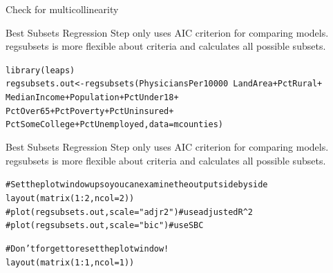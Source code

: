 \documentclass{beamer}\usepackage[]{graphicx}\usepackage[]{color}
\makeatletter
\newcommand{\hlnum}[1]{\textcolor[rgb]{0.824,0.412,0.118}{#1}}%
\newcommand{\hlcom}[1]{\textcolor[rgb]{0.824,0.706,0.549}{#1}}%
\newcommand{\hlopt}[1]{\textcolor[rgb]{1,0.894,0.769}{#1}}%
\newcommand{\hlstd}[1]{\textcolor[rgb]{1,0.894,0.769}{#1}}%
\newcommand{\hlkwb}[1]{\textcolor[rgb]{0.804,0.776,0.451}{#1}}%
\newcommand{\hlkwc}[1]{\textcolor[rgb]{0.78,0.941,0.545}{#1}}%
\newcommand{\hlkwd}[1]{\textcolor[rgb]{1,0.78,0.769}{#1}}%
\newenvironment{kframe}{%
 \def\at@end@of@kframe{}%
 \ifinner\ifhmode%
  \def\at@end@of@kframe{\end{minipage}}%
  \begin{minipage}{\columnwidth}%
 \fi\fi%
 \def\FrameCommand##1{\hskip\@totalleftmargin \hskip-\fboxsep
 \colorbox{shadecolor}{##1}\hskip-\fboxsep
     \hskip-\linewidth \hskip-\@totalleftmargin \hskip\columnwidth}%
 \MakeFramed {\advance\hsize-\width
   \@totalleftmargin\z@ \linewidth\hsize
   \@setminipage}}%
 {\par\unskip\endMakeFramed%
 \at@end@of@kframe}
\newenvironment{knitrout}{}{} %
\makeatother
\begin{document}
\begin{darkframes}
\begin{frame}[fragile]{Check for multicollinearity}
    \end{frame}


    \begin{frame}[fragile]{Best Subsets Regression}
     Step only uses AIC criterion for comparing models. regsubsets is more flexible about criteria and calculates all possible subsets. 

\begin{knitrout}
\begin{kframe}
\begin{alltt}
\hlkwd{library}\hlstd{(leaps)}
\hlstd{regsubsets.out} \hlkwb{<-} \hlkwd{regsubsets}\hlstd{(PhysiciansPer10000} \hlopt{~} \hlstd{LandArea}\hlopt{+}\hlstd{PctRural}\hlopt{+}
            \hlstd{MedianIncome}\hlopt{+}\hlstd{Population}\hlopt{+}\hlstd{PctUnder18}\hlopt{+}
            \hlstd{PctOver65}\hlopt{+}\hlstd{PctPoverty}\hlopt{+}\hlstd{PctUninsured}\hlopt{+}
            \hlstd{PctSomeCollege}\hlopt{+}\hlstd{PctUnemployed,} \hlkwc{data}\hlstd{=mcounties)}
\end{alltt}
\end{kframe}
\end{knitrout}

    \end{frame}


    \begin{frame}[fragile]{Best Subsets Regression}
     Step only uses AIC criterion for comparing models. regsubsets is more flexible about criteria and calculates all possible subsets. 

\begin{knitrout}
\begin{kframe}
\begin{alltt}
\hlcom{# Set the plot window up so you can examine the output side by side}
\hlkwd{layout}\hlstd{(}\hlkwd{matrix}\hlstd{(}\hlnum{1}\hlopt{:}\hlnum{2}\hlstd{,} \hlkwc{ncol}\hlstd{=}\hlnum{2}\hlstd{))}
\hlcom{#plot(regsubsets.out, scale="adjr2")  # use adjusted R^2}
\hlcom{#plot(regsubsets.out, scale="bic")    # use SBC}

\hlcom{# Don’t forget to reset the plot window!}
\hlkwd{layout}\hlstd{(}\hlkwd{matrix}\hlstd{(}\hlnum{1}\hlopt{:}\hlnum{1}\hlstd{,} \hlkwc{ncol}\hlstd{=}\hlnum{1}\hlstd{))}
\end{alltt}
\end{kframe}
\end{knitrout}

    \end{frame}


\end{darkframes}
\end{document}
